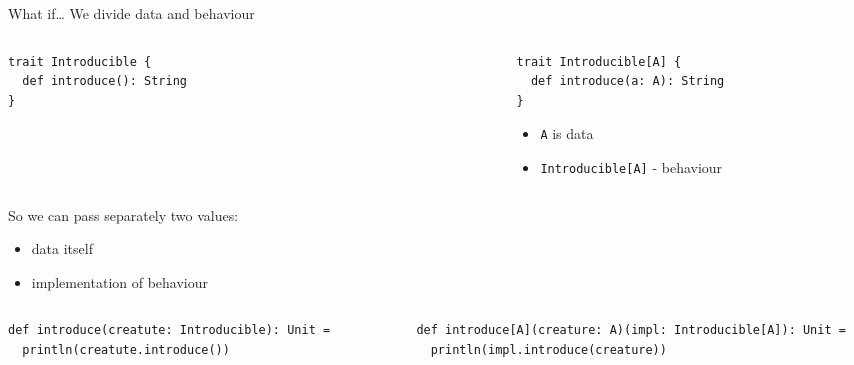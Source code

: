 \documentclass[presentation,aspectratio=169,smaller]{beamer}
\begin{document}
\begin{frame}[label={sec:orgc35fca6},fragile]{What if\ldots{}}
 We divide data and behaviour

\pause

\begin{columns}
\begin{column}[t]{0.42\columnwidth}
\begin{verbatim}
trait Introducible {
  def introduce(): String
}
\end{verbatim}
\end{column}

\begin{column}[t]{0.05\columnwidth}
\vspace*{0px}

{\large \Rightarrow}
\end{column}

\begin{column}[t]{0.55\columnwidth}
\begin{verbatim}
trait Introducible[A] {
  def introduce(a: A): String
}
\end{verbatim}

\begin{itemize}
\item \texttt{A} is data
\item \texttt{Introducible[A]} - behaviour
\end{itemize}
\end{column}
\end{columns}

\pause

\vspace*{1cm}

So we can pass separately two values:

\begin{itemize}
\item data itself
\item implementation of behaviour
\end{itemize}

\pause

\begin{columns}
\begin{column}[t]{0.42\columnwidth}
\begin{verbatim}
def introduce(creatute: Introducible): Unit =
  println(creatute.introduce())
\end{verbatim}
\end{column}

\begin{column}[t]{0.05\columnwidth}
\vspace*{0px}

{\large \Rightarrow}
\end{column}

\begin{column}[t]{0.55\columnwidth}
\begin{verbatim}
def introduce[A](creature: A)(impl: Introducible[A]): Unit =
  println(impl.introduce(creature))
\end{verbatim}
\end{column}
\end{columns}
\end{frame}
\end{document}
